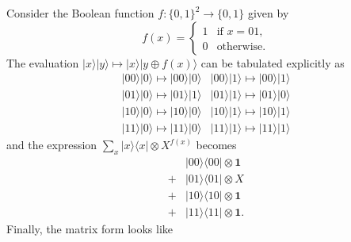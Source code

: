 \documentclass[fleqn]{article}
\begin{document}
Consider the Boolean function \(f\colon\{0,1\}^2\to\{0,1\}\) given by
\[
  f(x)
  =
  \begin{cases}
    1 &\text{if $x=01$,}
  \\0 &\text{otherwise.}
  \end{cases}
\]
The evaluation \(|x\rangle|y\rangle \mapsto |x\rangle|y\oplus f(x)\rangle\) can be tabulated explicitly as
\[
  \begin{array}{cc}
    |00\rangle|0\rangle \mapsto |00\rangle|0\rangle
    & |00\rangle|1\rangle \mapsto |00\rangle|1\rangle
  \\|01\rangle|0\rangle \mapsto |01\rangle|1\rangle
    & |01\rangle|1\rangle \mapsto |01\rangle|0\rangle
  \\|10\rangle|0\rangle \mapsto |10\rangle|0\rangle
    & |10\rangle|1\rangle \mapsto |10\rangle|1\rangle
  \\|11\rangle|0\rangle \mapsto |11\rangle|0\rangle
    & |11\rangle|1\rangle \mapsto |11\rangle|1\rangle
  \end{array}
\]
and the expression \(\sum_x |x\rangle\langle x|\otimes X^{f(x)}\) becomes
\[
  \begin{aligned}
    &|00\rangle\langle 00| \otimes \mathbf{1}
  \\+ &|01\rangle\langle 01| \otimes X
  \\+ &|10\rangle\langle 10| \otimes \mathbf{1}
  \\+ &|11\rangle\langle 11| \otimes \mathbf{1}.
  \end{aligned}
\]
Finally, the matrix form looks like
\end{document}
